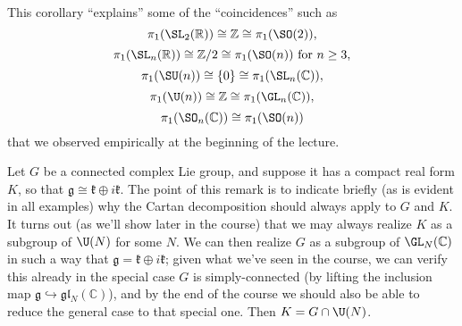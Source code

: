 \documentclass[reqno]{amsart} 
\begin{document}
\begin{remark}
  \label{rmk:}
  This corollary ``explains'' some of the ``coincidences'' such as
  \begin{equation*}
    \pi_1(\SL_2(\mathbb{R})) \cong \mathbb{Z} \cong \pi_1(\SO(2)),
  \end{equation*}
  \begin{equation*}
    \pi_1(\SL_n(\mathbb{R})) \cong \mathbb{Z}/2 \cong \pi_1(\SO(n)) \text{ for } n \geq 3,
  \end{equation*}
  \begin{equation*}
    \pi_1(\SU(n)) \cong \{0\} \cong \pi_1(\SL_n(\mathbb{C})),
  \end{equation*}
  \begin{equation*}
    \pi_1(\U(n)) \cong \mathbb{Z} \cong \pi_1(\GL_n(\mathbb{C})),
  \end{equation*}
  \begin{equation*}
    \pi_1(\SO_n(\mathbb{C})) \cong \pi_1(\SO(n))
  \end{equation*}
  that we observed empirically at the beginning of the lecture.
\end{remark}

\begin{remark}
  Let $G$ be a connected complex Lie group, and suppose it has a compact real form $K$, so that $\mathfrak{g} \cong \mathfrak{k} \oplus i \mathfrak{k}$.  The point of this remark is to indicate briefly (as is evident in all examples) why the Cartan decomposition should always apply to $G$ and $K$.  It turns out (as we'll show later in the course) that we may always realize $K$ as a subgroup of $\U(N)$ for some $N$.  We can then realize $G$ as a subgroup of $\GL_N(\mathbb{C})$ in such a way that $\mathfrak{g} = \mathfrak{k} \oplus i \mathfrak{k}$; given what we've seen in the course, we can verify this already in the special case $G$ is simply-connected (by lifting the inclusion map $\mathfrak{g} \hookrightarrow \mathfrak{g} \mathfrak{l}_N(\mathbb{C})$), and by the end of the course we should also be able to reduce the general case to that special one.  Then $K = G \cap \U(N)$.
\end{remark}
\end{document}
